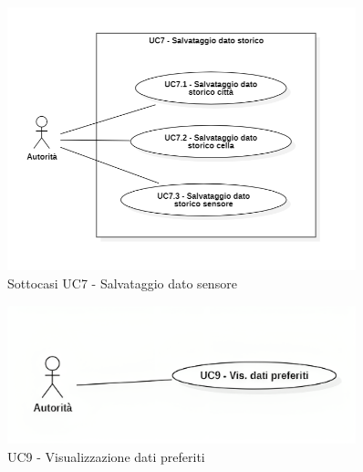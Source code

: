 \begin{figure}[H]
    \centering
    \includegraphics[width=0.9\textwidth]{../Images/uc7_Subcase.PNG}
    \caption{Sottocasi UC7 - Salvataggio dato sensore}
    \label{fig:UC7_sub}
\end{figure}







\begin{figure}[H]
    \centering
    \includegraphics[width=0.9\textwidth]{../Images/uc9.png}
    \caption{UC9 - Visualizzazione dati preferiti}
    \label{fig:UC9}
\end{figure}


